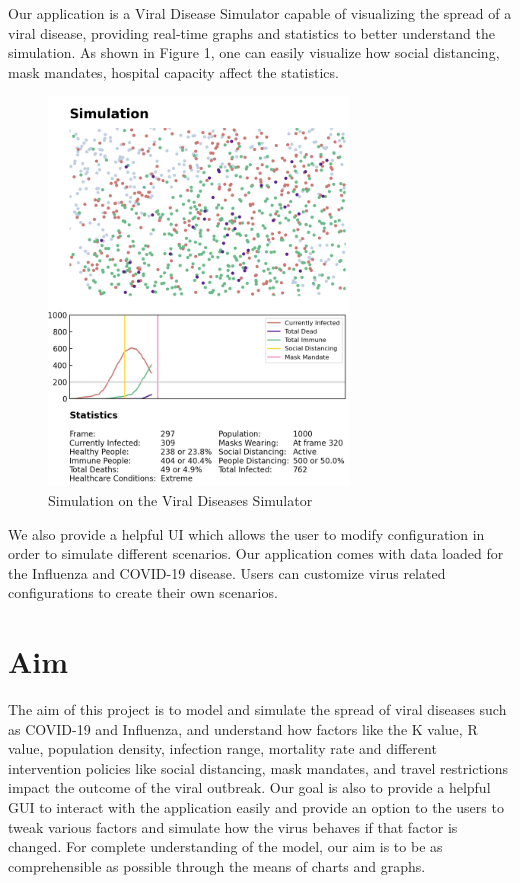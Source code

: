 \documentclass[11pt]{article}
\begin{document}
Our application is a Viral Disease Simulator capable of visualizing  the spread of a viral disease, providing real-time graphs and statistics to better understand the simulation. As shown in Figure 1, one can easily visualize how social distancing, mask mandates, hospital capacity affect the statistics. 

\begin{figure}[H]
\caption{Simulation on the Viral Diseases Simulator}\label{wrap-fig:1}
\includegraphics[width=8cm]{figures/intro-simulation.png}
\end{figure} 

We also provide a helpful UI which allows the user to modify configuration in order to simulate different scenarios. Our application comes with data loaded for the Influenza and COVID-19 disease. Users can customize virus related configurations to create their own scenarios.

\section{Aim}
The aim of this project is to model and simulate the spread of viral diseases such as COVID-19 and Influenza, and understand how factors like the K value, R value, population density, infection range, mortality rate and different intervention policies like social distancing, mask mandates, and travel restrictions impact the outcome of the viral outbreak. Our goal is also to provide a helpful GUI to interact with the application easily and provide an option to the users to tweak various factors and simulate how the virus behaves if that factor is changed. For complete understanding of the model, our aim is to be as comprehensible as possible through the means of charts and graphs.
\end{document}

